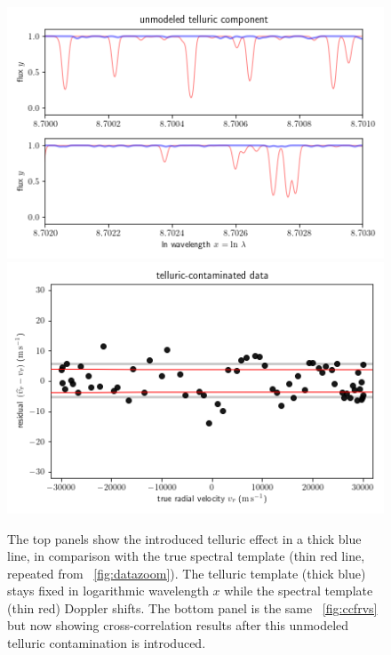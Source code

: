 \documentclass[modern]{aastex631}
\newcommand{\figref}[1]{\figurename~\ref{#1}}
\begin{document}
\begin{figure}[tp]
  \begin{mdframed}
    \begin{center}
    \includegraphics[width=\textwidth]{../notebook/telluricmodel.png}
    \includegraphics[width=\textwidth]{../notebook/telluric.png}
    \end{center}
    \caption{The top panels show the introduced telluric effect in a thick blue line, in comparison with the true spectral template (thin red line, repeated from \figref{fig:datazoom}). The telluric template (thick blue) stays fixed in logarithmic wavelength $x$ while the spectral template (thin red) Doppler shifts. The bottom panel is the same \figref{fig:ccfrvs} but now showing cross-correlation results after this unmodeled telluric contamination is introduced.\label{fig:telluric}}
  \end{mdframed}
\end{figure}
\end{document}
